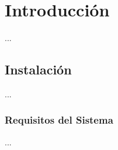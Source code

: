 \documentclass{article}
\begin{document}
\section{Introducción}
...
\subsection{Instalación}
...
\subsubsection{Requisitos del Sistema}
...
\end{document}
